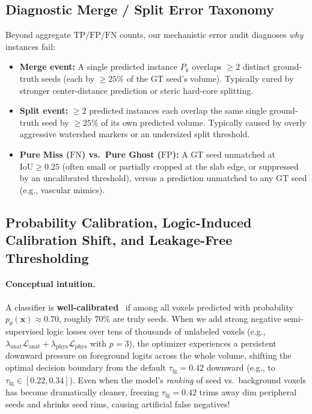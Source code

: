 \documentclass[10pt,a4paper]{article}
\renewcommand{\_}{\origunderscore\allowbreak}
\begin{document}
\subsection{Diagnostic Merge / Split Error Taxonomy}

Beyond aggregate $\text{TP}/\text{FP}/\text{FN}$ counts, our mechanistic error audit diagnoses \emph{why} instances fail:
\begin{itemize}
    \item \textbf{Merge event:} A single predicted instance $P_k$ overlaps $\ge 2$ distinct ground-truth seeds (each by $\ge 25\%$ of the GT seed's volume). Typically cured by stronger center-distance prediction or steric hard-core splitting.
    \item \textbf{Split event:} $\ge 2$ predicted instances each overlap the same single ground-truth seed by $\ge 25\%$ of its own predicted volume. Typically caused by overly aggressive watershed markers or an undersized split threshold.
    \item \textbf{Pure Miss ($\text{FN}$) vs.\ Pure Ghost ($\text{FP}$):} A GT seed unmatched at $\text{IoU} \ge 0.25$ (often small or partially cropped at the slab edge, or suppressed by an uncalibrated threshold), versus a prediction unmatched to any GT seed (e.g., vascular mimics).
\end{itemize}

\subsection{Probability Calibration, Logic-Induced Calibration Shift, and Leakage-Free Thresholding}

\paragraph{Conceptual intuition.} A classifier is \textbf{well-calibrated}~\cite{guo2017calibration} if among all voxels predicted with probability $p_\theta(\mathbf{x}) \approx 0.70$, roughly $70\%$ are truly seeds. When we add strong negative semi-supervised logic losses over tens of thousands of unlabeled voxels (e.g., $\lambda_{\text{anat}}\mathcal{L}_{\text{anat}} + \lambda_{\text{phys}}\mathcal{L}_{\text{phys}}$ with $p=3$), the optimizer experiences a persistent downward pressure on foreground logits across the whole volume, shifting the optimal decision boundary from the default $\tau_{\text{fg}} = 0.42$ downward (e.g., to $\tau_{\text{fg}} \in [0.22, 0.34]$). Even when the model's \emph{ranking} of seed vs.\ background voxels has become dramatically cleaner, freezing $\tau_{\text{fg}} = 0.42$ trims away dim peripheral seeds and shrinks seed rims, causing artificial false negatives!
\end{document}
